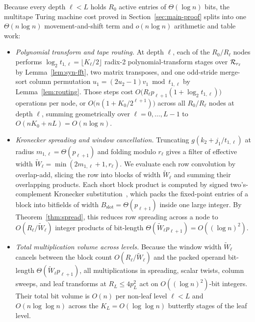 Because every depth $\ell < L$ holds $R_0$ active entries of $\Theta(\log n)$ bits, the multitape Turing machine cost proved in Section~\ref{sec:main-proof} splits into one $\Theta(n \log n)$ movement-and-shift term and $o(n \log n)$ arithmetic and table work:
\begin{itemize}[leftmargin=*,itemsep=2pt,parsep=0pt,topsep=3pt]
  \item \emph{Polynomial transform and tape routing.} At depth $\ell$, each of the $R_0 / R_\ell$ nodes performs $\log_2 t_{1,\ell} = \lfloor K_\ell / 2 \rfloor$ radix-2 polynomial-transform stages over $\mathcal{R}_{r_\ell}$ by Lemma~\ref{lem:syn-fft}, two matrix transposes, and one odd-stride merge-sort column permutation $u_1 = (2u_2 - 1) v_1 \bmod t_{1,\ell}$ by Lemma~\ref{lem:routing}. Those steps cost $O\bigl(R_\ell p_{\ell+1}(1 + \log_2 t_{1,\ell})\bigr)$ operations per node, or $O\bigl(n(1 + K_0 / 2^{\ell+1})\bigr)$ across all $R_0 / R_\ell$ nodes at depth $\ell$, summing geometrically over $\ell = 0, \dots, L - 1$ to $O(n K_0 + n L) = O(n \log n)$.

  \item \emph{Kronecker spreading and window cancellation.} Truncating $g(k_2 + j_1 / t_{1,\ell})$ at radius $m_{1,\ell} = \Theta(p_{\ell+1})$ and folding modulo $r_\ell$ gives a filter of effective width $\tilde{W}_\ell = \min(2m_{1,\ell} + 1, r_\ell)$. We evaluate each row convolution by overlap-add, slicing the row into blocks of width $\tilde{W}_\ell$ and summing their overlapping products. Each short block product is computed by signed two's-complement Kronecker substitution~\cite{Schonhage82,Harvey09}, which packs the fixed-point entries of a block into bitfields of width $B_{\mathrm{slot}} = \Theta(p_{\ell+1})$ inside one large integer. By Theorem~\ref{thm:spread}, this reduces row spreading across a node to $O(R_\ell / \tilde{W}_\ell)$ integer products of bit-length $\Theta(\tilde{W}_\ell p_{\ell+1}) = O((\log n)^2)$.

  \item \emph{Total multiplication volume across levels.} Because the window width $\tilde{W}_\ell$ cancels between the block count $O(R_\ell / \tilde{W}_\ell)$ and the packed operand bit-length $\Theta(\tilde{W}_\ell p_{\ell+1})$, all multiplications in spreading, scalar twists, column sweeps, and leaf transforms at $R_L \le 4 p_L^2$ act on $O((\log n)^2)$-bit integers. Their total bit volume is $O(n)$ per non-leaf level $\ell < L$ and $O(n \log\log n)$ across the $K_L = O(\log\log n)$ butterfly stages of the leaf level.


\end{itemize}
